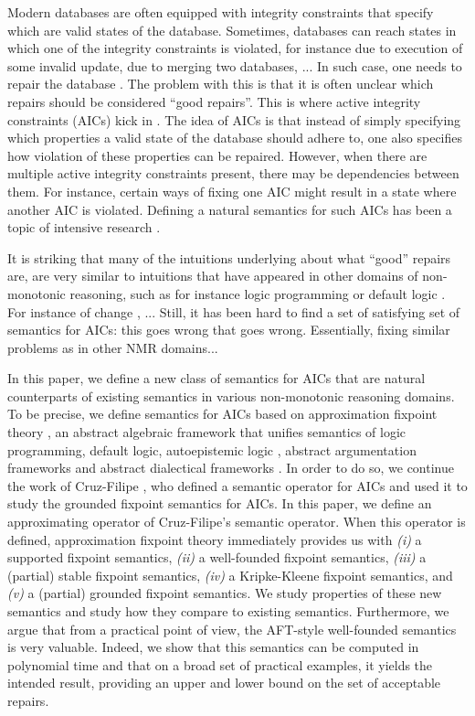 Modern databases are often equipped with integrity constraints that specify which are valid states of the database. 
Sometimes, databases can reach states in which one of the integrity constraints is violated, for instance due to execution of some invalid update, due to merging two databases, ... 
In such case, one needs to repair the database \cite{ai/EiterG92}. 
The problem with this is that it is often unclear which repairs should be considered ``good repairs''. 
This is where active integrity constraints (AICs)  kick in  . 
The idea of AICs is that instead of simply specifying which properties a valid state of the database should adhere to, one also specifies how violation of these properties can be repaired. 
However, when there are multiple active integrity constraints present, there may be dependencies between them. 
For instance, certain ways of fixing one AIC might result in a state where another AIC is violated. 
Defining a natural semantics for such AICs has been a topic of intensive research \cite{iclp/CaropreseGSZ06,sebd/MolinaroGC06,iclp/CaropreseTZ07,dasfaa/CaropreseGM07,iclp/CaropreseT08,tkde/CaropreseGZ09,tplp/CaropreseT11,corr/Cruz-Filipe16}. 

It is striking that many of the intuitions underlying about what ``good'' repairs are, are very similar to intuitions that have appeared in other domains of non-monotonic reasoning, such as for instance logic programming  or default logic . 
For instance  of change \cite{}, ... 
Still, it has been hard to find a set of satisfying set of semantics for AICs: this goes wrong that goes wrong. 
Essentially, fixing similar problems as in other NMR domains... 


In this paper, we define a new class of semantics for AICs that are natural counterparts of existing semantics in  various non-monotonic reasoning domains. 
To be precise, we define semantics for AICs based on approximation fixpoint theory , an abstract algebraic framework that unifies semantics of logic programming, default logic, autoepistemic logic , abstract argumentation frameworks  and abstract dialectical frameworks . 
In order to do so, we continue the work of Cruz-Filipe \cite{corr/Cruz-Filipe16}, who defined a semantic operator for AICs and used it to study the grounded fixpoint semantics  for AICs. 
In this paper, we define an approximating operator of Cruz-Filipe's semantic operator. 
When this operator is defined, approximation fixpoint theory immediately provides us with \textit{(i)} a supported fixpoint semantics, \textit{(ii)} a well-founded fixpoint semantics, \textit{(iii)} a (partial) stable fixpoint semantics, \textit{(iv)} a Kripke-Kleene fixpoint semantics, and \textit{(v)} a (partial) grounded fixpoint semantics. 
We study properties of these new semantics and study how they compare to existing semantics. 
Furthermore, we argue that from a practical point of view, the AFT-style well-founded semantics is very valuable. 
Indeed, we show that this semantics can be computed in polynomial time and that on a broad set of practical examples, it yields the intended result, providing an upper and lower bound on the set of acceptable repairs.  

